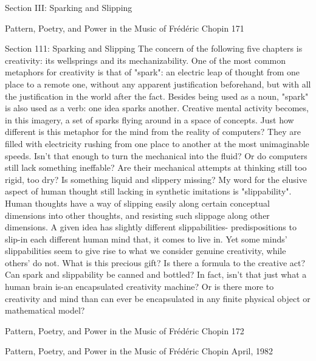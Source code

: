 
                                                       Section III:
                                             Sparking and Slipping




Pattern, Poetry, and Power in the Music of Frédéric Chopin      171

                                                             Section 111:
                                                   Sparking and Slipping
        The concern of the following five chapters is creativity: its wellsprings and its
mechanizability. One of the most common metaphors for creativity is that of "spark": an
electric leap of thought from one place to a remote one, without any apparent justification
beforehand, but with all the justification in the world after the fact. Besides being used as
a noun, "spark" is also used as a verb: one idea sparks another. Creative mental activity
becomes, in this imagery, a set of sparks flying around in a space of concepts. Just how
different is this metaphor for the mind from the reality of computers? They are filled with
electricity rushing from one place to another at the most unimaginable speeds. Isn't that
enough to turn the mechanical into the fluid? Or do computers still lack something
ineffable? Are their mechanical attempts at thinking still too rigid, too dry? Is something
liquid and slippery missing? My word for the elusive aspect of human thought still
lacking in synthetic imitations is "slippability". Human thoughts have a way of slipping
easily along certain conceptual dimensions into other thoughts, and resisting such
slippage along other dimensions. A given idea has slightly different slippabilities-
predispositions to slip-in each different human mind that, it comes to live in. Yet some
minds' slippabilities seem to give rise to what we consider genuine creativity, while
others' do not. What is this precious gift? Is there a formula to the creative act? Can spark
and slippability be canned and bottled? In fact, isn't that just what a human brain is-an
encapsulated creativity machine? Or is there more to creativity and mind than can ever be
encapsulated in any finite physical object or mathematical model?




Pattern, Poetry, and Power in the Music of Frédéric Chopin                               172

                      Pattern, Poetry, and Power
                   in the Music of Frédéric Chopin
                                       April, 1982



